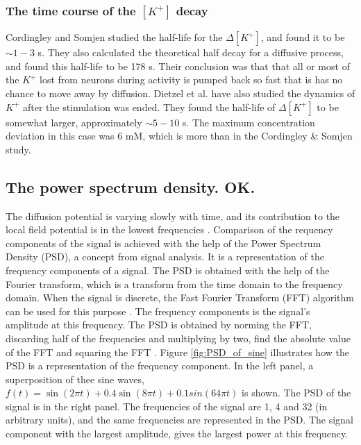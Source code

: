 \documentclass{article}
\begin{document}
\subsubsection{The time course of the $[K^+]$ decay }

Cordingley and Somjen \cite{CordingleySomjen} studied the half-life for the $\Delta[K^+]$, and found it to be $\sim 1-3$ s. They also calculated the theoretical half decay for a diffusive process, and found this half-life to be 178 s. Their conclusion was that that all or most
of the $K^+$ lost from neurons during activity is pumped back so fast that is has no
chance to move away by diffusion. Dietzel et al.\cite{Dietzel1982} have also studied the dynamics of $K^+$ after the stimulation was ended. They found the half-life of $\Delta [K^+]$ to be somewhat larger, approximately $\sim 5-10$ s. The maximum concentration deviation in this case was 6 mM, which is more than in the Cordingley \& Somjen study.

 
\subsection{The power spectrum density. OK.}\label{PSD}
The diffusion potential is varying slowly with time, and its contribution to the local field potential is in the lowest frequencies \cite{Halnes2016}. Comparison of the requency components of the signal is achieved with the help of the Power Spectrum Density (PSD), a concept from signal analysis. It is a representation of the frequency components of a signal. The PSD is obtained with the help of the Fourier transform, which is a transform from the time domain to the frequency domain. When the signal is discrete, the Fast Fourier Transform (FFT) algorithm can be used for this purpose \cite{wikipediaFFT}. The frequency components is the signal's amplitude at this frequency. The PSD is obtained by norming the FFT, discarding half of the frequencies and multiplying by two, find the absolute value of the FFT and squaring the FFT \cite{PSDtutorial}. Figure \ref{fig:PSD_of_sine} illustrates how the PSD is a representation of the frequency component. In the left panel, a superposition of thee sine waves, $f(t) = \sin (2\pi t) + 0.4 \sin (8\pi t)+ 0.1 sin (64\pi t)$ is shown. The PSD of the signal is in the right panel. The frequencies of the signal are 1, 4 and 32 (in arbitrary units), and the same frequencies are represented in the PSD. The signal component with the largest amplitude, gives the largest power at this frequency.
\end{document}
